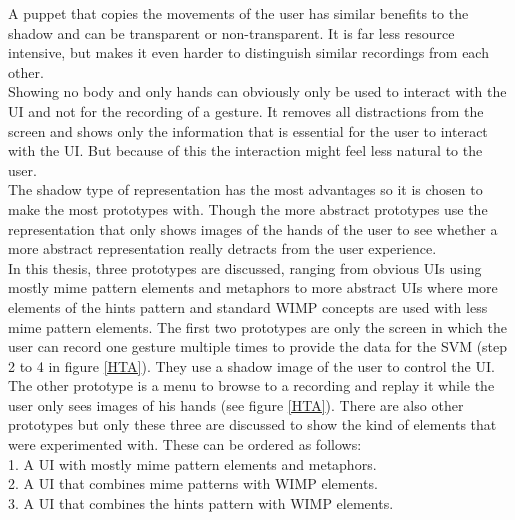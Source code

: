 A puppet that copies the movements of the user has similar benefits to the shadow and can be transparent or non-transparent. It is far less resource intensive, but makes it even harder to distinguish similar recordings from each other.\\
 
Showing no body and only hands can obviously only be used to interact with the UI and not for the recording of a gesture. It removes all distractions from the screen and shows only the information that is essential for the user to interact with the UI. But because of this the interaction might feel less natural to the user.\\
 
The shadow type of representation has the most advantages so it is chosen to make the most prototypes with. Though the more abstract prototypes use the representation that only shows images of the hands of the user to see whether a more abstract representation really detracts from the user experience.\\
 
In this thesis, three prototypes are discussed, ranging from obvious UIs using mostly mime pattern elements and metaphors to more abstract UIs where more elements of the hints pattern and standard WIMP concepts are used with less mime pattern elements. The first two prototypes are only the screen in which the user can record one gesture multiple times to provide the data for the SVM (step 2 to 4 in figure \ref{HTA}). They use a shadow image of the user to control the UI. The other prototype is a menu to browse to a recording and replay it while the user only sees images of his hands (see figure \ref{HTA}). There are also other prototypes but only these three are discussed to show the kind of elements that were experimented with. These can be ordered as follows:\\

1. A UI with mostly mime pattern elements and metaphors.\\
2. A UI that combines mime patterns with WIMP elements.\\
3. A UI that combines the hints pattern with WIMP elements.\\

